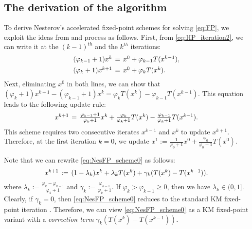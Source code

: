 \documentclass{article}
\theoremstyle{plain}
\theoremstyle{definition}
\newcommand{\0}{\boldsymbol{0}}
\begin{document}
\subsection{The derivation of the algorithm}\label{subsec:Nes_derivation}
To derive Nesterov's accelerated fixed-point schemes for solving \eqref{eq:FP}, we exploit the ideas from \cite{tran2022connection} and process as follows.
First, from \eqref{eq:HP_iteration2}, we can write it at the $(k-1)^{th}$ and the $k^{th}$ iterations:
\begin{equation*}
\arraycolsep=0.2em
\begin{array}{lcl}
(\varphi_{k-1} + 1)x^k & = &  x^0 + \varphi_{k-1}T(x^{k-1}), \vspace{1ex}\\
(\varphi_k + 1)x^{k+1} & = &  x^0 + \varphi_kT(x^k).
\end{array}
\end{equation*}
Next, eliminating $x^0$ in both lines, we can show that $(\varphi_k + 1)x^{k+1} - (\varphi_{k-1} + 1)x^k = \varphi_kT(x^k) - \varphi_{k-1}T(x^{k-1})$.
This equation leads to the following update rule:
\begin{equation}\label{eq:NesFP_scheme0}
\arraycolsep=0.2em
\begin{array}{lcl}
x^{k+1} &= & \frac{\varphi_{k-1} + 1}{\varphi_k + 1}x^k +  \frac{\varphi_k}{\varphi_k + 1}T(x^k) - \frac{\varphi_{k-1}}{\varphi_k + 1}T(x^{k-1}).
\end{array}
\end{equation}
This scheme requires two consecutive iterates $x^{k-1}$ and $x^k$ to update $x^{k+1}$.
Therefore, at the first iteration $k=0$, we update $x^1 := \frac{1}{\varphi_0 + 1}x^0 +  \frac{\varphi_0}{\varphi_0 + 1}T(x^0)$.

Note that we can rewrite \eqref{eq:NesFP_scheme0} as follows:
\begin{equation*} 
\arraycolsep=0.2em
\begin{array}{lcl}
x^{k+1} & := & (1 - \lambda_k)x^k +  \lambda_k T(x^k) + \gamma_k(T(x^k) - T(x^{k-1})).
\end{array}
\end{equation*}
where $\lambda_k := \frac{\varphi_k - \varphi_{k-1}}{\varphi_k + 1}$ and $\gamma_k := \frac{\varphi_{k-1}}{\varphi_k + 1}$.
If $\varphi_k > \varphi_{k-1} \geq 0$, then we have $\lambda_k \in (0, 1]$.
Clearly, if $\gamma_k = 0$, then \eqref{eq:NesFP_scheme0} reduces to the standard KM fixed-point iteration \cite{Bauschke2011}.
Therefore, we can view \eqref{eq:NesFP_scheme0} as a KM fixed-point variant with a \textit{correction term} $\gamma_k(T(x^k) - T(x^{k-1}))$.
\end{document}
